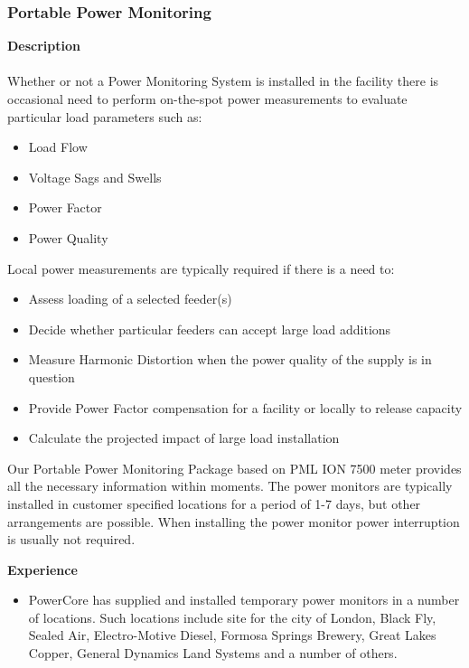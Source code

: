 \subsubsection{Portable Power Monitoring}
\label{Sub:Exp:PowM}

\textbf{Description}\\
\\
Whether or not a Power Monitoring System is installed in the facility there is occasional need to perform on-the-spot power measurements to evaluate particular load parameters such as:
\begin{itemize}
	\item Load Flow
	\item Voltage Sags and Swells
	\item Power Factor
	\item Power Quality
\end{itemize}
Local power measurements are typically required if there is a need to:
\begin{itemize}
	\item Assess loading of a selected feeder(s)
	\item Decide whether particular feeders can accept large load additions
	\item Measure Harmonic Distortion when the power quality of the supply is in question
	\item Provide Power Factor compensation for a facility or locally to release capacity
	\item Calculate the projected impact of large load installation
\end{itemize}

Our Portable Power Monitoring Package based on PML ION 7500 meter provides all the necessary information within moments. The power monitors are typically installed in customer specified locations for a period of 1-7 days, but other arrangements are possible. When installing the power monitor power interruption is usually not required.

\textbf{Experience}\\
\begin{itemize}
	\item PowerCore has supplied and installed temporary power monitors in a number of locations.  Such locations include site for the city of London, Black Fly, Sealed Air, Electro-Motive Diesel, Formosa Springs Brewery, Great Lakes Copper, General Dynamics Land Systems and a number of others.
\end{itemize}

